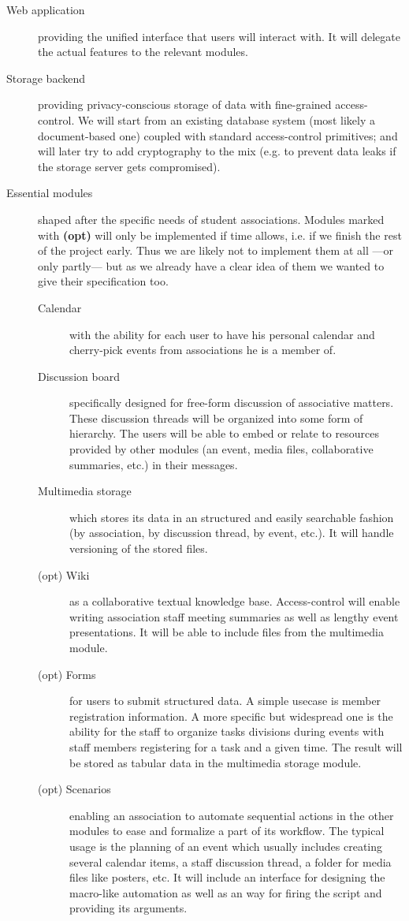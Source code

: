 \documentclass[a4paper, 12pt]{article}
\begin{document}
\begin{description}
  \item[Web application] providing the unified interface that users will interact with. It will delegate the actual features to the relevant modules.
  \item[Storage backend] providing privacy-conscious storage of data with fine-grained access-control. We will start from an existing database system (most likely a document-based one) coupled with standard access-control primitives; and will later try to add cryptography to the mix (e.g. to prevent data leaks if the storage server gets compromised).
  \item[Essential modules] shaped after the specific needs of student associations. Modules marked with \textbf{(opt)} will only be implemented if time allows, i.e. if we finish the rest of the project early. Thus we are likely not to implement them at all ---or only partly--- but as we already have a clear idea of them we wanted to give their specification too.
    \begin{description}
      \item[Calendar] with the ability for each user to have his personal calendar and cherry-pick events from associations he is a member of.
      \item[Discussion board] specifically designed for free-form discussion of associative matters. These discussion threads will be organized into some form of hierarchy. The users will be able to embed or relate to resources provided by other modules (an event, media files, collaborative summaries, etc.) in their messages.
      \item[Multimedia storage] which stores its data in an structured and easily searchable fashion (by association, by discussion thread, by event, etc.). It will handle versioning of the stored files.
      \item[(opt) Wiki] as a collaborative textual knowledge base. Access-control will enable writing association staff meeting summaries as well as lengthy event presentations. It will be able to include files from the multimedia module.
      \item[(opt) Forms] for users to submit structured data. A simple usecase is member registration information. A more specific but widespread one is the ability for the staff to organize tasks divisions during events with staff members registering for a task and a given time. The result will be stored as tabular data in the multimedia storage module.
      \item [(opt) Scenarios] enabling an association to automate sequential actions in the other modules to ease and formalize a part of its workflow. The typical usage is the planning of an event which usually includes creating several calendar items, a staff discussion thread, a folder for media files like posters, etc. It will include an interface for designing the macro-like automation as well as an way for firing the script and providing its arguments.
    \end{description}
\end{description}
\end{document}
